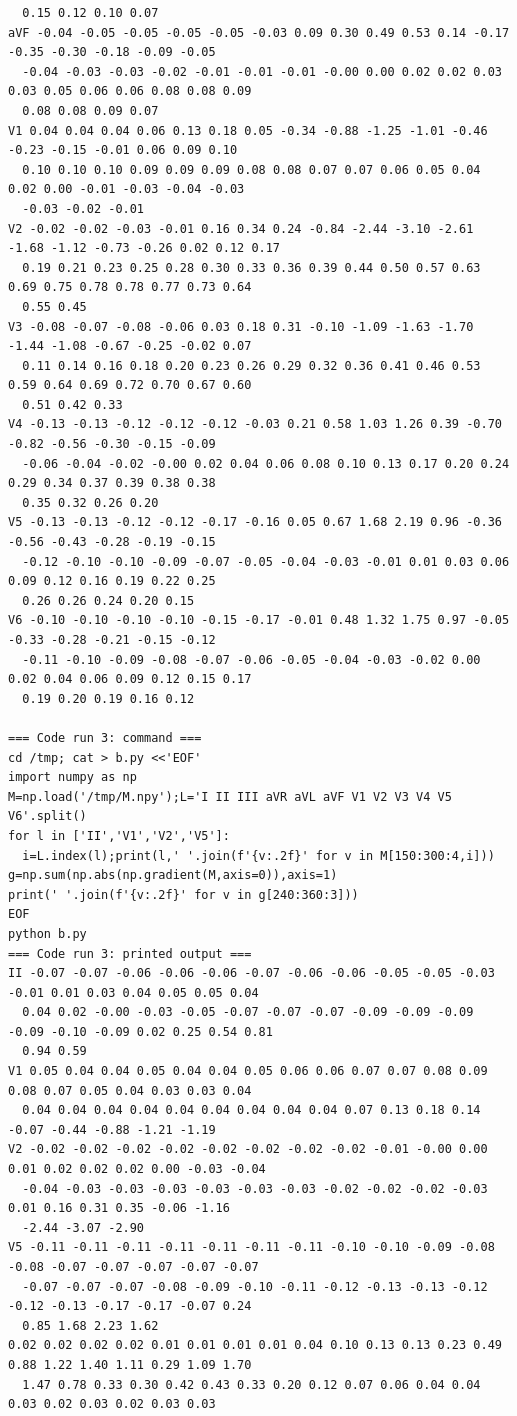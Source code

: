 \begin{scriptsize}
\begin{verbatim}
  0.15 0.12 0.10 0.07
aVF -0.04 -0.05 -0.05 -0.05 -0.05 -0.03 0.09 0.30 0.49 0.53 0.14 -0.17 -0.35 -0.30 -0.18 -0.09 -0.05 
  -0.04 -0.03 -0.03 -0.02 -0.01 -0.01 -0.01 -0.00 0.00 0.02 0.02 0.03 0.03 0.05 0.06 0.06 0.08 0.08 0.09 
  0.08 0.08 0.09 0.07
V1 0.04 0.04 0.04 0.06 0.13 0.18 0.05 -0.34 -0.88 -1.25 -1.01 -0.46 -0.23 -0.15 -0.01 0.06 0.09 0.10 
  0.10 0.10 0.10 0.09 0.09 0.09 0.08 0.08 0.07 0.07 0.06 0.05 0.04 0.02 0.00 -0.01 -0.03 -0.04 -0.03 
  -0.03 -0.02 -0.01
V2 -0.02 -0.02 -0.03 -0.01 0.16 0.34 0.24 -0.84 -2.44 -3.10 -2.61 -1.68 -1.12 -0.73 -0.26 0.02 0.12 0.17 
  0.19 0.21 0.23 0.25 0.28 0.30 0.33 0.36 0.39 0.44 0.50 0.57 0.63 0.69 0.75 0.78 0.78 0.77 0.73 0.64 
  0.55 0.45
V3 -0.08 -0.07 -0.08 -0.06 0.03 0.18 0.31 -0.10 -1.09 -1.63 -1.70 -1.44 -1.08 -0.67 -0.25 -0.02 0.07 
  0.11 0.14 0.16 0.18 0.20 0.23 0.26 0.29 0.32 0.36 0.41 0.46 0.53 0.59 0.64 0.69 0.72 0.70 0.67 0.60 
  0.51 0.42 0.33
V4 -0.13 -0.13 -0.12 -0.12 -0.12 -0.03 0.21 0.58 1.03 1.26 0.39 -0.70 -0.82 -0.56 -0.30 -0.15 -0.09 
  -0.06 -0.04 -0.02 -0.00 0.02 0.04 0.06 0.08 0.10 0.13 0.17 0.20 0.24 0.29 0.34 0.37 0.39 0.38 0.38 
  0.35 0.32 0.26 0.20
V5 -0.13 -0.13 -0.12 -0.12 -0.17 -0.16 0.05 0.67 1.68 2.19 0.96 -0.36 -0.56 -0.43 -0.28 -0.19 -0.15 
  -0.12 -0.10 -0.10 -0.09 -0.07 -0.05 -0.04 -0.03 -0.01 0.01 0.03 0.06 0.09 0.12 0.16 0.19 0.22 0.25 
  0.26 0.26 0.24 0.20 0.15
V6 -0.10 -0.10 -0.10 -0.10 -0.15 -0.17 -0.01 0.48 1.32 1.75 0.97 -0.05 -0.33 -0.28 -0.21 -0.15 -0.12 
  -0.11 -0.10 -0.09 -0.08 -0.07 -0.06 -0.05 -0.04 -0.03 -0.02 0.00 0.02 0.04 0.06 0.09 0.12 0.15 0.17 
  0.19 0.20 0.19 0.16 0.12

=== Code run 3: command ===
cd /tmp; cat > b.py <<'EOF'
import numpy as np
M=np.load('/tmp/M.npy');L='I II III aVR aVL aVF V1 V2 V3 V4 V5 V6'.split()
for l in ['II','V1','V2','V5']:
  i=L.index(l);print(l,' '.join(f'{v:.2f}' for v in M[150:300:4,i]))
g=np.sum(np.abs(np.gradient(M,axis=0)),axis=1)
print(' '.join(f'{v:.2f}' for v in g[240:360:3]))
EOF
python b.py
=== Code run 3: printed output ===
II -0.07 -0.07 -0.06 -0.06 -0.06 -0.07 -0.06 -0.06 -0.05 -0.05 -0.03 -0.01 0.01 0.03 0.04 0.05 0.05 0.04 
  0.04 0.02 -0.00 -0.03 -0.05 -0.07 -0.07 -0.07 -0.09 -0.09 -0.09 -0.09 -0.10 -0.09 0.02 0.25 0.54 0.81 
  0.94 0.59
V1 0.05 0.04 0.04 0.05 0.04 0.04 0.05 0.06 0.06 0.07 0.07 0.08 0.09 0.08 0.07 0.05 0.04 0.03 0.03 0.04 
  0.04 0.04 0.04 0.04 0.04 0.04 0.04 0.04 0.04 0.07 0.13 0.18 0.14 -0.07 -0.44 -0.88 -1.21 -1.19
V2 -0.02 -0.02 -0.02 -0.02 -0.02 -0.02 -0.02 -0.02 -0.01 -0.00 0.00 0.01 0.02 0.02 0.02 0.00 -0.03 -0.04 
  -0.04 -0.03 -0.03 -0.03 -0.03 -0.03 -0.03 -0.02 -0.02 -0.02 -0.03 0.01 0.16 0.31 0.35 -0.06 -1.16 
  -2.44 -3.07 -2.90
V5 -0.11 -0.11 -0.11 -0.11 -0.11 -0.11 -0.11 -0.10 -0.10 -0.09 -0.08 -0.08 -0.07 -0.07 -0.07 -0.07 -0.07 
  -0.07 -0.07 -0.07 -0.08 -0.09 -0.10 -0.11 -0.12 -0.13 -0.13 -0.12 -0.12 -0.13 -0.17 -0.17 -0.07 0.24 
  0.85 1.68 2.23 1.62
0.02 0.02 0.02 0.02 0.01 0.01 0.01 0.01 0.04 0.10 0.13 0.13 0.23 0.49 0.88 1.22 1.40 1.11 0.29 1.09 1.70 
  1.47 0.78 0.33 0.30 0.42 0.43 0.33 0.20 0.12 0.07 0.06 0.04 0.04 0.03 0.02 0.03 0.02 0.03 0.03


\end{verbatim}
\end{scriptsize}
